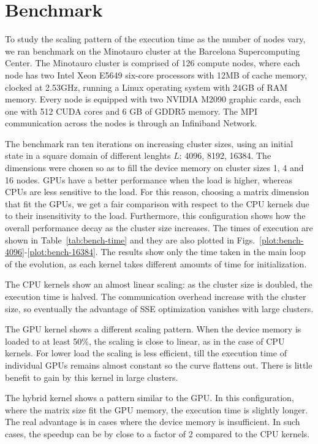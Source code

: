 \chapter{Benchmark}
To study the scaling pattern of the execution time as the number of nodes vary, we ran benchmark on the Minotauro cluster at the Barcelona Supercomputing Center. The Minotauro cluster is comprised of 126 compute nodes, where each node has two Intel Xeon E5649 six-core processors with 12MB of cache memory, clocked at 2.53GHz, running a Linux operating system with 24GB of RAM memory. Every node is equipped with two NVIDIA M2090 graphic cards, each one with 512 CUDA cores and 6 GB of GDDR5 memory. The MPI communication across the nodes is through an Infiniband Network. 

The benchmark ran ten iterations on increasing cluster sizes, using an initial state in a square domain of different lenghts $L$: 4096, 8192, 16384. The dimensions were chosen so as to fill the device memory on cluster sizes 1, 4 and 16 nodes. GPUs have a better performance when the load is higher, whereas CPUs are less sensitive to the load. For this reason, choosing a matrix dimension that fit the GPUs, we get a fair comparison with respect to the CPU kernels due to their insensitivity to the load. Furthermore, this configuration shows how the overall performance decay as the cluster size increases. The times of execution are shown in Table~\ref{tab:bench-time} and they are also plotted in Figs.~\ref{plot:bench-4096}-\ref{plot:bench-16384}.
The results show only the time taken in the main loop of the evolution, as each kernel takes different amounts of time for initialization.

The CPU kernels show an almost linear scaling: as the cluster size is doubled, the execution time is halved. The communication overhead increase with the cluster size, so eventually the advantage of SSE optimization vanishes with large clusters.

The GPU kernel shows a different scaling pattern. When the device memory is loaded to at least 50\%, the scaling is close to linear, as in the case of CPU kernels. For lower load the scaling is less efficient, till the execution time of individual GPUs remains almost constant so the curve flattens out. There is little benefit to gain by this kernel in large clusters.

The hybrid kernel shows a pattern similar to the GPU. In this configuration, where the matrix size fit the GPU memory, the execution time is slightly longer. The real advantage is in cases where the device memory is insufficient. In such cases, the speedup can be by close to a factor of 2 compared to the CPU kernels.

